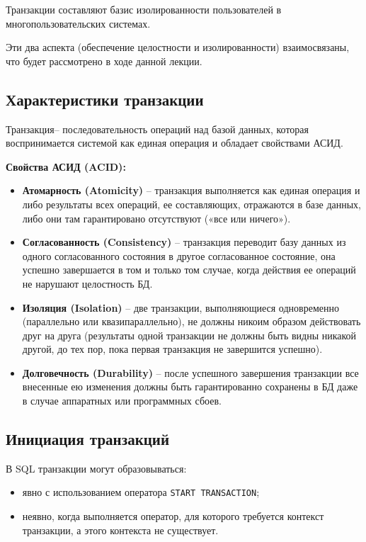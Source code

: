 \documentclass[a4paper,12pt]{article}
\begin{document}
Транзакции составляют базис изолированности пользователей в многопользовательских системах.

Эти два аспекта (обеспечение целостности и изолированности) взаимосвязаны, что будет рассмотрено в ходе данной лекции.

\subsection{Характеристики транзакции}

Транзакция– последовательность операций над базой данных, которая воспринимается системой как единая операция и обладает свойствами АСИД.

\textbf{Свойства АСИД (ACID):}
\begin{itemize}
    \item \textbf{Атомарность (Atomicity)} – транзакция выполняется как единая операция и либо результаты всех операций, ее составляющих, отражаются в базе данных, либо они там гарантировано отсутствуют («все или ничего»).
    \item \textbf{Согласованность (Consistency)} – транзакция переводит базу данных из одного согласованного состояния в другое согласованное состояние, она успешно завершается в том и только том случае, когда действия ее операций не нарушают целостность БД.
    \item \textbf{Изоляция (Isolation)} – две транзакции, выполняющиеся одновременно (параллельно или квазипараллельно), не должны никоим образом действовать друг на друга (результаты одной транзакции не должны быть видны никакой другой, до тех пор, пока первая транзакция не завершится успешно).
    \item \textbf{Долговечность (Durability)} – после успешного завершения транзакции все внесенные ею изменения должны быть гарантированно сохранены в БД даже в случае аппаратных или программных сбоев.
\end{itemize}

\subsection{Инициация транзакций}

В SQL транзакции могут образовываться:
\begin{itemize}
    \item явно с использованием оператора \texttt{START TRANSACTION};
    \item неявно, когда выполняется оператор, для которого требуется контекст транзакции, а этого контекста не существует.
\end{itemize}
\end{document}
